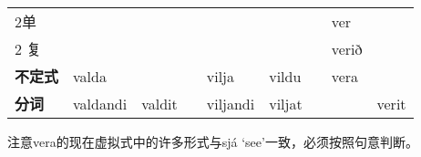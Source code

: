 \begin{longtable}{lllllllll}
    2单           &          &                    &  &            &        &  & ver      &            \\
    2 复          &          &                    &  &            &        &  & verið    &            \\
    \textbf{不定式} & valda    &                    &  & vilja      & vildu  &  & vera     &            \\
    \textbf{分词}  & valdandi & valdit             &  & viljandi   & viljat &  &          &
    verit                                                                                            \\
\end{longtable}

注意vera的现在虚拟式中的许多形式与sjá `see‌'一致，必须按照句意判断。
